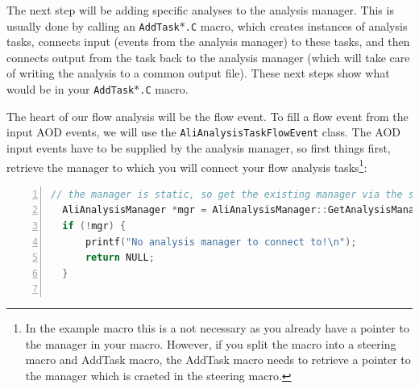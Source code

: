 \documentclass[a4paper]{book}
\numberwithin{equation}{subsection}
\begin{document}
\begin{description}
The next step will be adding specific analyses to the analysis manager. This is usually done by calling an \texttt{AddTask$\ast$.C} macro, which creates instances of analysis tasks, connects input (events from the analysis manager) to these tasks, and then connects output from the task back to the analysis manager (which will take care of writing the analysis to a common output file). These next steps show what would be in your \texttt{AddTask$\ast$.C} macro.
  
The heart of our flow analysis will be the flow event. To fill a flow event from the input AOD events, we will use the \texttt{AliAnalysisTaskFlowEvent} class. The AOD input events have to be supplied by the analysis manager, so first things first, retrieve the manager to which you will connect your flow analysis tasks\footnote{In the example macro this is a not necessary as you already have a pointer to the manager in your macro. However, if you split the macro into a steering macro and AddTask macro, the AddTask macro needs to retrieve a pointer to the manager which is craeted in the steering macro.}:

\begin{lstlisting}[language=C, numbers=left]
  // the manager is static, so get the existing manager via the static method
  AliAnalysisManager *mgr = AliAnalysisManager::GetAnalysisManager();
  if (!mgr) {
      printf("No analysis manager to connect to!\n");
      return NULL;
  }
        

\end{lstlisting}
\end{description}
\end{document}

